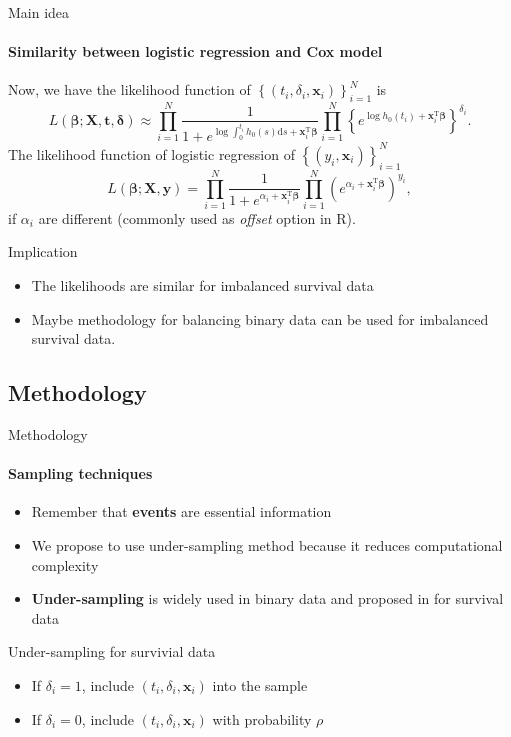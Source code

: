 \documentclass{beamer}
\newcommand{\red}{\color{red}}
\newcommand{\blue}{\color{blue}}
\newcommand{\bbeta}{\bm{\beta}}
\newcommand{\x}{\bm{x}}
\newcommand{\X}{\bm{X}}
\newcommand{\y}{\bm{y}}
\newcommand{\tp}{^{\mathrm{T}}}
\newcommand{\bdelta}{\bm{\delta}}
\newcommand{\bt}{\bm{t}}
\begin{document}
    \begin{frame}{Main idea}
    \framesubtitle{Similarity between logistic regression and Cox model}
    Now, we have the likelihood function of $\left\{(t_i,\delta_i,\x_i)\right\}_{i=1}^{N}$ is
    \begin{equation*}
        L(\bbeta;\X,\bt,\bdelta)\approx
        \prod_{i=1}^N \frac{1}{1+e^{\log\int_{0}^{t_i}h_0(s)\mathrm{d}s+\x_i\tp\bbeta}}
            \prod_{i=1}^N\left\{e^{\log h_0(t_i)+\x_i\tp\bbeta}\right\}^{\delta_i}.
    \end{equation*}
        The likelihood function of logistic regression of $\left\{(y_i,\x_i)\right\}_{i=1}^{N}$
        \begin{equation*}
            L(\bbeta;\X,\y)=\prod_{i=1}^{N}\frac{1}{1+e^{\alpha_i+\x_i\tp\bbeta}}\prod_{i=1}^N\left(e^{\alpha_i+\x_i\tp\bbeta}\right)^{y_i},
        \end{equation*}
    if $\alpha_i$ are different (commonly used as \textit{offset} option in R).
    \begin{block}{Implication}
    \begin{itemize}
        \item The likelihoods are similar for {\blue imbalanced survival data}
        \item Maybe methodology for {\blue balancing binary data} can be used for {\blue imbalanced survival data}.
    \end{itemize}
    \end{block}
    \end{frame}

    \subsection{Methodology}
    \begin{frame}{Methodology}
    \framesubtitle{Sampling techniques}
    \begin{itemize}
        \item Remember that {\red\textbf{events}} are essential information
        \item We propose to use under-sampling method because it reduces computational complexity
        \item {\blue\textbf{Under-sampling}} is widely used in {\blue binary data} and proposed in \cite{nir2023analyzing} for {\blue survival data}
    \end{itemize}
    \begin{exampleblock}{Under-sampling for survivial data}
        \begin{itemize}
            \item If $\delta_i=1$, include $(t_i, \delta_i, \x_i)$ into the sample
            \item If $\delta_i=0$, include $(t_i, \delta_i, \x_i)$ with probability $\rho$
        \end{itemize}
    \end{exampleblock}
    \end{frame}
\end{document}
